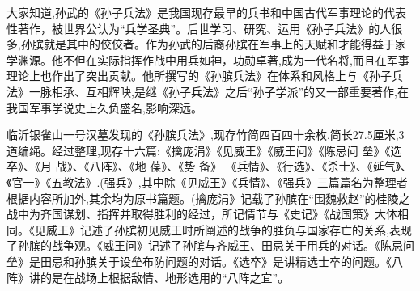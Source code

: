 \documentclass[12pt,UTF8]{ctexbook}
\begin{document}
大家知道,孙武的《孙子兵法》是我国现存最早的兵书和中国古代军事理论的代表性著作，被世界公认为“兵学圣典”。后世学习、研究、运用《孙子兵法》的人很多,孙膑就是其中的佼佼者。作为孙武的后裔孙膑在军事上的天赋和才能得益于家学渊源。他不但在实际指挥作战中用兵如神，功勋卓著,成为一代名将,而且在军事理论上也作出了突出贡献。他所撰写的《孙膑兵法》在体系和风格上与《孙子兵法》一脉相承、互相辉映,是继《孙子兵法》之后“孙子学派”的又一部重要著作,在我国军事学说史上久负盛名,影响深远。

临沂银雀山一号汉墓发现的《孙膑兵法》,现存竹简四百四十余枚,简长27.5厘米,3道编绳。经过整理,现存十六篇:《擒庞涓》《见威王》《威王问》《陈忌问 垒》《选卒》、《月 战》、《八阵》、《地 葆》、《势 备》
《兵情》、《行选》、《杀士》、《延气》、《官一》《五教法》.(强兵》,其中除《见威王》《兵情》、《强兵》三篇篇名为整理者根据内容所加外,其余均为原书篇题。(擒庞涓》记载了孙膑在“围魏救赵”的桂陵之战中为齐国谋划、指挥并取得胜利的经过，所记情节与《史记》《战国策》大体相同。《见威王》记述了孙膑初见威王时所阐述的战争的胜负与国家存亡的关系,表现了孙膑的战争观。《威王问》记述了孙膑与齐威王、田忌关于用兵的对话。《陈忌问垒》是田忌和孙膑关于设垒布防问题的对话。《选卒》是讲精选士卒的问题。《八阵》讲的是在战场上根据敌情、地形选用的“八阵之宜”。
\end{document}
